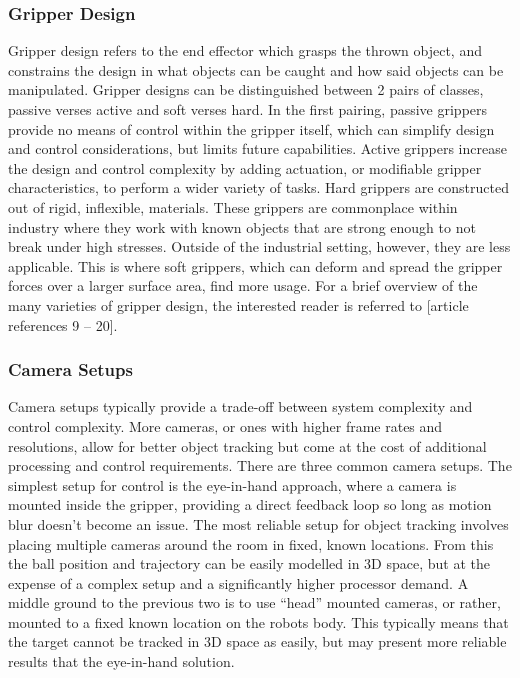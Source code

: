 \documentclass[conference]{IEEEtran}
\begin{document}
\subsubsection{Gripper Design}
Gripper design refers to the end effector which grasps the thrown object, and constrains the design in what objects can be caught and how said objects can be manipulated. Gripper designs can be distinguished between 2 pairs of classes, passive verses active and soft verses hard.
In the first pairing, passive grippers provide no means of control within the gripper itself, which can simplify design and control considerations, but limits future capabilities. Active grippers increase the design and control complexity by adding actuation, or modifiable gripper characteristics, to perform a wider variety of tasks.
Hard grippers are constructed out of rigid, inflexible, materials. These grippers are commonplace within industry where they work with known objects that are strong enough to not break under high stresses. Outside of the industrial setting, however, they are less applicable. This is where soft grippers, which can deform and spread the gripper forces over a larger surface area, find more usage.
For a brief overview of the many varieties of gripper design, the interested reader is referred to [article references 9 – 20].

\subsubsection{Camera Setups}
Camera setups typically provide a trade-off between system complexity and control complexity. More cameras, or ones with higher frame rates and resolutions, allow for better object tracking but come at the cost of additional processing and control requirements.
There are three common camera setups. The simplest setup for control is the eye-in-hand approach, where a camera is mounted inside the gripper, providing a direct feedback loop so long as motion blur doesn’t become an issue.
The most reliable setup for object tracking involves placing multiple cameras around the room in fixed, known locations. From this the ball position and trajectory can be easily modelled in 3D space, but at the expense of a complex setup and a significantly higher processor demand.
A middle ground to the previous two is to use “head” mounted cameras, or rather, mounted to a fixed known location on the robots body. This typically means that the target cannot be tracked in 3D space as easily, but may present more reliable results that the eye-in-hand solution. 
\end{document}
